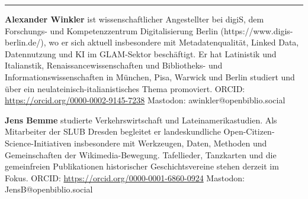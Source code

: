 \begin{center}\rule{0.5\linewidth}{0.5pt}\end{center}

\textbf{Alexander Winkler} ist wissenschaftlicher Angestellter bei
digiS, dem Forschungs- und Kompetenzzentrum Digitalisierung Berlin
(https://www.digis-berlin.de/), wo er sich aktuell insbesondere mit
Metadatenqualität, Linked Data, Datennutzung und KI im GLAM-Sektor
beschäftigt. Er hat Latinistik und Italianstik,
Renaissancewissenschaften und Bibliotheks- und
Informationswissenschaften in München, Pisa, Warwick und Berlin studiert
und über ein neulateinisch-italianistisches Thema promoviert. ORCID:
\url{https://orcid.org/0000-0002-9145-7238} \textbar{} Mastodon:
awinkler@openbiblio.social

\textbf{Jens Bemme} studierte Verkehrswirtschaft und
Lateinamerikastudien. Als Mitarbeiter der SLUB Dresden begleitet er
landeskundliche Open-Citizen-Science-Initiativen insbesondere mit
Werkzeugen, Daten, Methoden und Gemeinschaften der Wikimedia-Bewegung.
Tafellieder, Tanzkarten und die gemeinfreien Publikationen historischer
Geschichtsvereine stehen derzeit im Fokus. ORCID:
\url{https://orcid.org/0000-0001-6860-0924} \textbar{} Mastodon:
JensB@openbiblio.social
